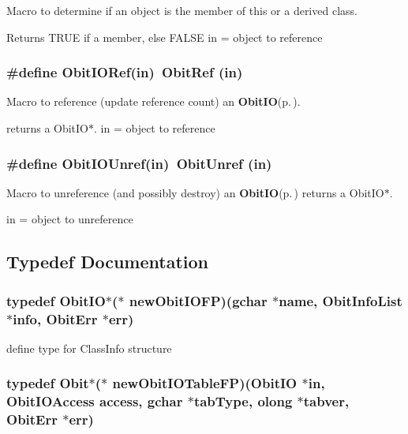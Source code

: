 Macro to determine if an object is the member of this or a derived class. 

Returns TRUE if a member, else FALSE in = object to reference 
\subsubsection{\setlength{\rightskip}{0pt plus 5cm}\#define Obit\-IORef(in)\ Obit\-Ref (in)}\label{ObitIO_8h_a1}


Macro to reference (update reference count) an {\bf Obit\-IO}{\rm (p.\,\pageref{structObitIO})}. 

returns a Obit\-IO$\ast$. in = object to reference 
\subsubsection{\setlength{\rightskip}{0pt plus 5cm}\#define Obit\-IOUnref(in)\ Obit\-Unref (in)}\label{ObitIO_8h_a0}


Macro to unreference (and possibly destroy) an {\bf Obit\-IO}{\rm (p.\,\pageref{structObitIO})} returns a Obit\-IO$\ast$. 

in = object to unreference 

\subsection{Typedef Documentation}
\subsubsection{\setlength{\rightskip}{0pt plus 5cm}typedef {\bf Obit\-IO}$\ast$($\ast$ {\bf new\-Obit\-IOFP})(gchar $\ast$name, {\bf Obit\-Info\-List} $\ast$info, {\bf Obit\-Err} $\ast$err)}\label{ObitIO_8h_a3}


define type for Class\-Info structure 

\subsubsection{\setlength{\rightskip}{0pt plus 5cm}typedef {\bf Obit}$\ast$($\ast$ {\bf new\-Obit\-IOTable\-FP})({\bf Obit\-IO} $\ast$in, Obit\-IOAccess access, gchar $\ast$tab\-Type, {\bf olong} $\ast$tabver, {\bf Obit\-Err} $\ast$err)}\label{ObitIO_8h_a25}


